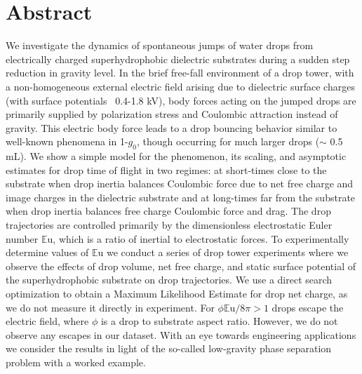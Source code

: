 \documentclass[12pt,a4paper,oneside]{book}
\begin{document}
\section*{Abstract}
\noindent
We investigate the dynamics of spontaneous jumps of water drops from electrically charged superhydrophobic dielectric substrates during a sudden step reduction in gravity level. In the brief free-fall environment of a drop tower, with a non-homogeneous external electric field arising due to dielectric surface charges (with surface potentials ~0.4-1.8 kV), body forces acting on the jumped drops are primarily supplied by polarization stress and Coulombic attraction instead of gravity. This electric body force leads to a drop bouncing behavior similar to well-known phenomena in 1-$g_0$, though occurring for much larger drops ($\sim$ 0.5 mL). We show a simple model for the phenomenon, its scaling, and asymptotic estimates for drop time of flight in two regimes: at short-times close to the substrate when drop inertia balances Coulombic force due to net free charge and image charges in the dielectric substrate and at long-times far from the substrate when drop inertia balances free charge Coulombic force and drag. The drop trajectories are controlled primarily by the dimensionless electrostatic Euler number $\mathbb{E}\mbox{u}$, which is a ratio of inertial to electrostatic forces. To experimentally determine values of $\mathbb{E}\mbox{u}$ we conduct a series of drop tower experiments where we observe the effects of drop volume, net free charge, and static surface potential of the superhydrophobic substrate on drop trajectories. We use a direct search optimization to obtain a Maximum Likelihood Estimate for drop net charge, as we do not measure it directly in experiment. For $\phi \mathbb{E}\mbox{u} /8 \pi > 1$ drops escape the electric field, where $\phi$ is a drop to substrate aspect ratio. However, we do not observe any escapes in our dataset. With an eye towards engineering applications we consider the results in light of the so-called low-gravity phase separation problem with a worked example.

\clearpage

\vspace*{\fill}
\end{document}
